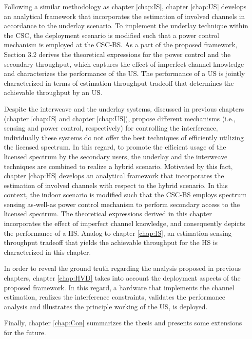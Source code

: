 Following a similar methodology as chapter \ref{chap:IS}, chapter \ref{chap:US} develops an analytical framework that incorporates the estimation of involved channels in accordance to the underlay scenario. To implement the underlay technique within the CSC, the deployment scenario is modified such that a power control mechanism is employed at the CSC-BS. As a part of the proposed framework, Section 3.2 derives the theoretical expressions for the power control and the secondary throughput, which captures the effect of imperfect channel knowledge and characterizes the performance of the US. The performance of a US is jointly characterized in terms of estimation-throughput tradeoff that determines the achievable throughput by an US. 

Despite the interweave and the underlay systems, discussed in previous chapters (chapter \ref{chap:IS} and chapter \ref{chap:US}), propose different mechanisms (i.e., sensing and power control, respectively) for controlling the interference, individually these systems do not offer the best techniques of efficiently utilizing the licensed spectrum. In this regard, to promote the efficient usage of the licensed spectrum by the secondary users, the underlay and the interweave techniques are combined to realize a hybrid scenario. Motivated by this fact, chapter \ref{chap:HS} develops an analytical framework that incorporates the estimation of involved channels with respect to the hybrid scenario. In this context, the indoor scenario is modified such that the CSC-BS employs spectrum sensing as-well-as power control mechanism to perform secondary access to the licensed spectrum. The theoretical expressions derived in this chapter incorporates the effect of imperfect channel knowledge, and consequently depicts the performance of a HS. Analog to chapter \ref{chap:IS}, an estimation-sensing-throughput tradeoff that yields the achievable throughput for the HS is characterized in this chapter. 

 
In order to reveal the ground truth regarding the analysis proposed in previous chapters, chapter \ref{chap:HVD} takes into account the deployment aspects of the proposed framework. In this regard, a hardware that implements the channel estimation, realizes the interference constraints, validates the performance analysis and illustrates the principle working of the US, is deployed.   

Finally, chapter \ref{chap:Con} summarizes the thesis and presents some extensions for the future. 
